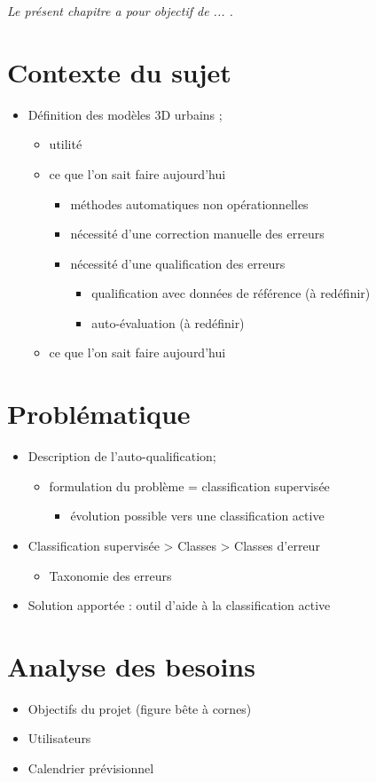 
\textit{Le présent chapitre a pour objectif de ... . }

\section{Contexte du sujet}

\begin{itemize}
	\item Définition des modèles 3D urbains ;
	\begin{itemize}
		\item utilité
		\item ce que l'on sait faire aujourd'hui
		\begin{itemize}
			\item méthodes automatiques non opérationnelles
			\item nécessité d'une correction manuelle des erreurs
			\item nécessité d'une qualification des erreurs
			\begin{itemize}
				\item qualification avec données de référence (à redéfinir)
				\item auto-évaluation (à redéfinir)
			\end{itemize}
		\end{itemize}
		\item ce que l'on sait faire aujourd'hui
	\end{itemize}
\end{itemize}


\section{Problématique}

\begin{itemize}
	\item Description de l'auto-qualification;
	\begin{itemize}
		\item formulation du problème = classification supervisée
		\begin{itemize}
			\item évolution possible vers une classification active
		\end{itemize}
	\end{itemize}
	\item Classification supervisée > Classes > Classes d'erreur
	\begin{itemize}
		\item Taxonomie des erreurs
	\end{itemize}
	\item Solution apportée : outil d'aide à la classification active
\end{itemize}

\section{Analyse des besoins}

\begin{itemize}
	\item Objectifs du projet (figure bête à cornes)
	\item Utilisateurs 
	\item Calendrier prévisionnel
\end{itemize}

